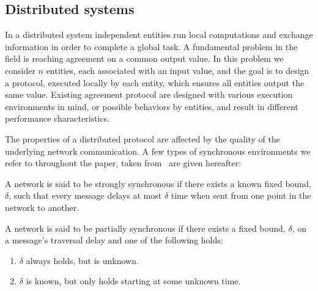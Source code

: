 \subsection{Distributed systems}
In a distributed system independent entities run local computations and exchange information in order to complete a global task. A fundamental problem in the field is reaching agreement on a common output value. In this problem we consider $n$ entities, each associated with an input value, and the goal is to design a protocol, executed locally by each entity, which ensures all entities output the same value. Existing agreement protocol are designed with various execution environments in mind, or possible behaviors by entities, and result in different performance characteristics.

The properties of a distributed protocol are affected by the quality of the underlying network communication. A few types of synchronous environments we refer to throughout the paper, taken from~\cite{SynchronyDefs} are given hereafter:
\begin{definition}
A network is said to be strongly synchronous if there exists a known fixed bound, $\delta$, such that every message delays at most $\delta$ time when sent from one point in the network to another.
\end{definition}

\begin{definition}
A network is said to be partially synchronous if there exists a fixed bound, $\delta$, on a message's traversal delay and one of the following holds:
\begin{enumerate}
\item $\delta$ always holds, but is unknown.
\item $\delta$ is known, but only holds starting at some unknown time.
\end{enumerate}
\end{definition}


